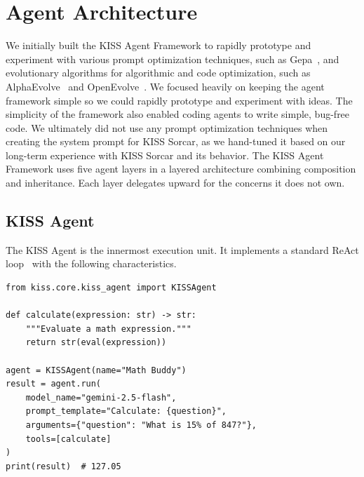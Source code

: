 \documentclass{article}
\begin{document}
\section{Agent Architecture}
\label{sec:architecture}

We initially built the KISS Agent Framework to rapidly prototype and experiment with various prompt optimization techniques, such as Gepa~\citep{agrawal2025gepa}, and evolutionary algorithms for algorithmic and code optimization, such as AlphaEvolve~\citep{novikov2025alphaevolve} and OpenEvolve~\citep{openevolve2025}. We focused heavily on keeping the agent framework simple so we could rapidly prototype and experiment with ideas.  The simplicity of the framework also enabled coding agents to write simple, bug-free code.  We ultimately did not use any prompt optimization techniques when creating the system prompt for KISS Sorcar, as we hand-tuned it based on our long-term experience with KISS Sorcar and its behavior.  The KISS Agent Framework uses five agent layers in a layered architecture combining composition and inheritance. Each layer delegates upward for the concerns it does not own.

\subsection{KISS Agent}
\label{sec:kiss-agent}

The KISS Agent is the innermost execution unit.  It implements a standard ReAct loop~\citep{yao2023react} with the following characteristics.  

\begin{lstlisting}[style=kisspy,numbers=none,caption={A complete KISS agent with a single tool.},label={lst:simple-agent}]
from kiss.core.kiss_agent import KISSAgent

def calculate(expression: str) -> str:
    """Evaluate a math expression."""
    return str(eval(expression))

agent = KISSAgent(name="Math Buddy")
result = agent.run(
    model_name="gemini-2.5-flash",
    prompt_template="Calculate: {question}",
    arguments={"question": "What is 15% of 847?"},
    tools=[calculate]
)
print(result)  # 127.05
\end{lstlisting}
\end{document}
